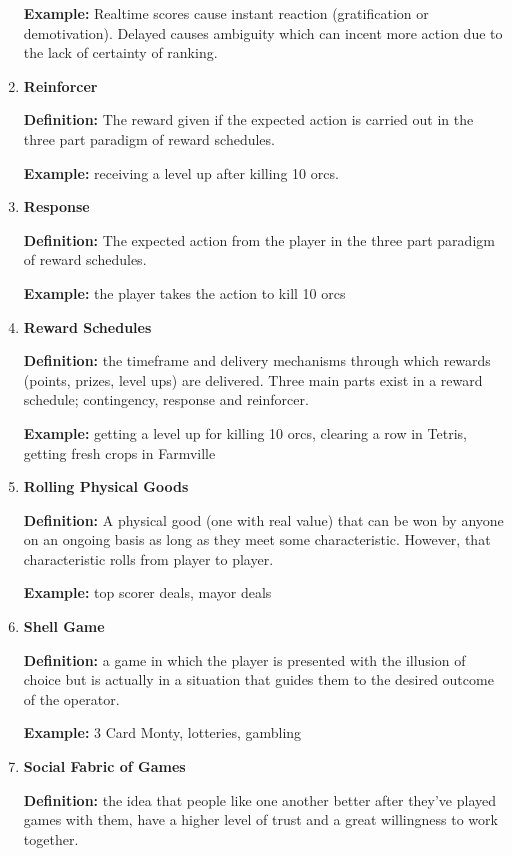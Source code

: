 \begin{enumerate}
\textbf{Example:} Realtime scores cause instant reaction (gratification or demotivation). Delayed causes ambiguity which can incent more action due to the lack of certainty of ranking.

\item \textbf{Reinforcer}

\textbf{Definition:} The reward given if the expected action is carried out in the three part paradigm of reward schedules.

\textbf{Example:} receiving a level up after killing 10 orcs.

\item \textbf{Response}

\textbf{Definition:} The expected action from the player in the three part paradigm of reward schedules.

\textbf{Example:} the player takes the action to kill 10 orcs

\item \textbf{Reward Schedules}

\textbf{Definition:} the timeframe and delivery mechanisms through which rewards (points, prizes, level ups) are delivered. Three main parts exist in a reward schedule; contingency, response and reinforcer.

\textbf{Example:} getting a level up for killing 10 orcs, clearing a row in Tetris, getting fresh crops in Farmville

\item \textbf{Rolling Physical Goods}

\textbf{Definition:} A physical good (one with real value) that can be won by anyone on an ongoing basis as long as they meet some characteristic. However, that characteristic rolls from player to player.

\textbf{Example:} top scorer deals, mayor deals

\item \textbf{Shell Game}

\textbf{Definition:} a game in which the player is presented with the illusion of choice but is actually in a situation that guides them to the desired outcome of the operator.

\textbf{Example:} 3 Card Monty, lotteries, gambling

\item \textbf{Social Fabric of Games}

\textbf{Definition:} the idea that people like one another better after they’ve played games with them, have a higher level of trust and a great willingness to work together.


\end{enumerate}
